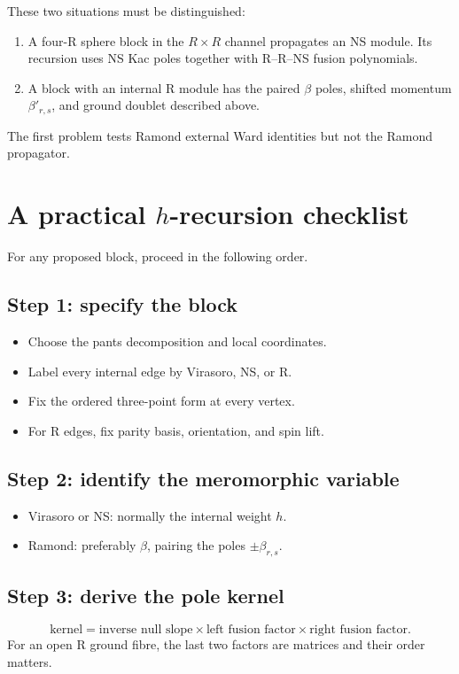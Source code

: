 \documentclass[11pt]{article}
\begin{document}
These two situations must be distinguished:
\begin{enumerate}
 \item A four-R sphere block in the \(R\times R\) channel propagates an NS
 module.  Its recursion uses NS Kac poles together with R--R--NS fusion
 polynomials.
 \item A block with an internal R module has the paired \(\beta\) poles,
 shifted momentum \(\beta'_{r,s}\), and ground doublet described above.
\end{enumerate}
The first problem tests Ramond external Ward identities but not the
Ramond propagator.

\section{\texorpdfstring{A practical \(h\)-recursion checklist}
{A practical h-recursion checklist}}
\label{sec:checklist}

For any proposed block, proceed in the following order.

\subsection*{Step 1: specify the block}
\begin{itemize}
 \item Choose the pants decomposition and local coordinates.
 \item Label every internal edge by Virasoro, NS, or R.
 \item Fix the ordered three-point form at every vertex.
 \item For R edges, fix parity basis, orientation, and spin lift.
\end{itemize}

\subsection*{Step 2: identify the meromorphic variable}
\begin{itemize}
 \item Virasoro or NS: normally the internal weight \(h\).
 \item Ramond: preferably \(\beta\), pairing the poles
 \(\pm\beta_{r,s}\).
\end{itemize}

\subsection*{Step 3: derive the pole kernel}
\begin{equation}
 \text{kernel}
 =
 \text{inverse null slope}
 \times
 \text{left fusion factor}
 \times
 \text{right fusion factor}.
\end{equation}
For an open R ground fibre, the last two factors are matrices and their
order matters.
\end{document}

